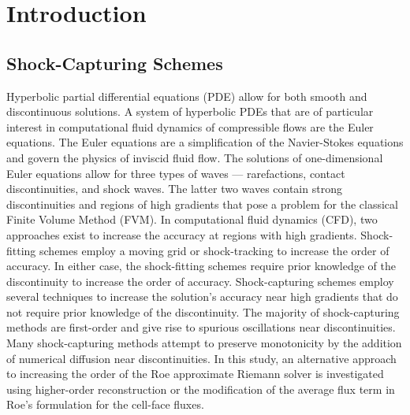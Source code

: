 \chapter{Introduction}
\label{ch:intro}
\section{Shock-Capturing Schemes}

Hyperbolic partial differential equations (PDE) allow for both smooth and discontinuous solutions. A system of hyperbolic PDEs that are of particular interest in computational fluid dynamics of compressible flows are the Euler equations. The Euler equations are a simplification of the Navier-Stokes equations and govern the physics of inviscid fluid flow. The solutions of one-dimensional Euler equations allow for three types of waves --- rarefactions, contact discontinuities, and shock waves. The latter two waves contain strong discontinuities and regions of high gradients that pose a problem for the classical Finite Volume Method (FVM). In computational fluid dynamics (CFD), two approaches exist to increase the accuracy at regions with high gradients. Shock-fitting schemes employ a moving grid or shock-tracking to increase the order of accuracy. In either case, the shock-fitting schemes require prior knowledge of the discontinuity to increase the order of accuracy. Shock-capturing schemes employ several techniques to increase the solution's accuracy near high gradients that do not require prior knowledge of the discontinuity. The majority of shock-capturing methods are first-order and give rise to spurious oscillations near discontinuities. Many shock-capturing methods attempt to preserve monotonicity by the addition of numerical diffusion near discontinuities. In this study, an alternative approach to increasing the order of the Roe approximate Riemann solver is investigated using higher-order reconstruction or the modification of the average flux term in Roe's formulation for the cell-face fluxes.

